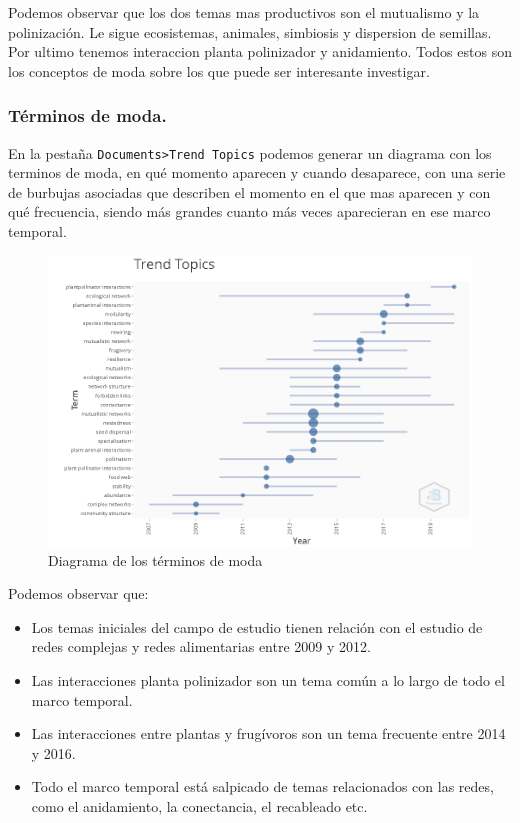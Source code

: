 \documentclass[
]{article}
\providecommand{\tightlist}{%
  \setlength{\itemsep}{0pt}\setlength{\parskip}{0pt}}
\begin{document}
Podemos observar que los dos temas mas productivos son el mutualismo y
la polinización. Le sigue ecosistemas, animales, simbiosis y dispersion
de semillas. Por ultimo tenemos interaccion planta polinizador y
anidamiento. Todos estos son los conceptos de moda sobre los que puede
ser interesante investigar.

\hypertarget{tuxe9rminos-de-moda.}{%
\subsubsection{Términos de moda.}\label{tuxe9rminos-de-moda.}}

En la pestaña \texttt{Documents\textgreater{}Trend\ Topics} podemos
generar un diagrama con los terminos de moda, en qué momento aparecen y
cuando desaparece, con una serie de burbujas asociadas que describen el
momento en el que mas aparecen y con qué frecuencia, siendo más grandes
cuanto más veces aparecieran en ese marco temporal.

\begin{figure}
\centering
\includegraphics{TrendTopics.png}
\caption{Diagrama de los términos de moda}
\end{figure}

Podemos observar que:

\begin{itemize}
\tightlist
\item
  Los temas iniciales del campo de estudio tienen relación con el
  estudio de redes complejas y redes alimentarias entre 2009 y 2012.
\item
  Las interacciones planta polinizador son un tema común a lo largo de
  todo el marco temporal.
\item
  Las interacciones entre plantas y frugívoros son un tema frecuente
  entre 2014 y 2016.
\item
  Todo el marco temporal está salpicado de temas relacionados con las
  redes, como el anidamiento, la conectancia, el recableado etc.
\end{itemize}
\end{document}

